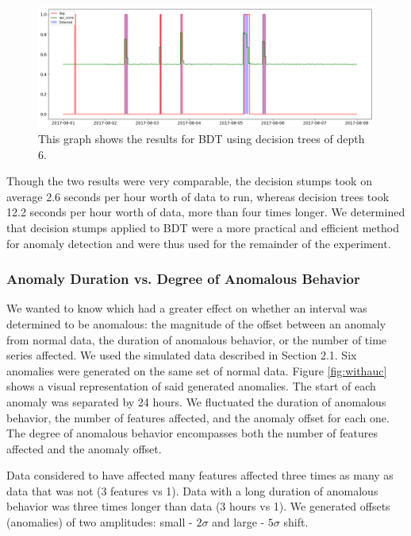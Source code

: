 \documentclass[5p]{elsarticle}
\begin{document}
\begin{figure}[htbp]
    \centering
    \includegraphics[width=\linewidth]{shaded-tree.png}
    \caption{This graph shows the results for BDT using decision trees of depth 6.}
    \label{fig:shaded-tree}
\end{figure}

Though the two results were very comparable, the decision stumps took on average 2.6 seconds per hour worth of data to run, whereas decision trees took 12.2 seconds per hour worth of data, more than four times longer. We determined that decision stumps applied to BDT were a more practical and efficient method for anomaly detection and were thus used for the remainder of the experiment.

\subsubsection{Anomaly Duration vs. Degree of Anomalous Behavior}

We wanted to know which had a greater effect on whether an interval was determined to be anomalous: the magnitude of the offset between an anomaly from normal data, the duration of anomalous behavior, or the number of time series affected. We used the simulated data described in Section 2.1. Six anomalies were generated on the same set of normal data. Figure \ref{fig:withauc} shows a visual representation of said generated anomalies. The start of each anomaly was separated by 24 hours. We fluctuated the duration of anomalous behavior, the number of features affected, and the anomaly offset for each one. The degree of anomalous behavior encompasses both the number of features affected and the anomaly offset.

Data considered to have affected many features affected three times as many as data that was not (3 features vs 1). Data with a long duration of anomalous behavior was three times longer than data (3 hours vs 1). We generated offsets (anomalies) of two amplitudes: small - $2\sigma$ and large - $5\sigma$ shift. 
\end{document}
